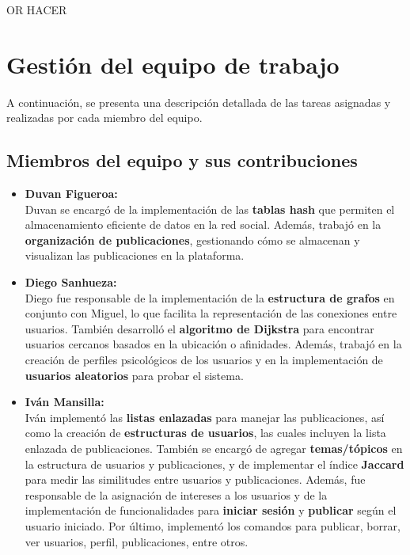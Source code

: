 \documentclass[9pt,letterpaper,onecolumn]{rho-class/rho}
\begin{document}
    OR HACER

\section{Gestión del equipo de trabajo}

    A continuación, se presenta una descripción detallada de las tareas asignadas y realizadas por cada miembro del equipo.
    
    \subsection{Miembros del equipo y sus contribuciones}
    
    \begin{itemize}
        \item \textbf{Duvan Figueroa:} \\
        Duvan se encargó de la implementación de las \textbf{tablas hash} que permiten el almacenamiento eficiente de datos en la red social. Además, trabajó en la \textbf{organización de publicaciones}, gestionando cómo se almacenan y visualizan las publicaciones en la plataforma.
    
        \item \textbf{Diego Sanhueza:} \\
        Diego fue responsable de la implementación de la \textbf{estructura de grafos} en conjunto con Miguel, lo que facilita la representación de las conexiones entre usuarios. También desarrolló el \textbf{algoritmo de Dijkstra} para encontrar usuarios cercanos basados en la ubicación o afinidades. Además, trabajó en la creación de perfiles psicológicos de los usuarios y en la implementación de \textbf{usuarios aleatorios} para probar el sistema.
    
        \item \textbf{Iván Mansilla:} \\
        Iván implementó las \textbf{listas enlazadas} para manejar las publicaciones, así como la creación de \textbf{estructuras de usuarios}, las cuales incluyen la lista enlazada de publicaciones. También se encargó de agregar \textbf{temas/tópicos} en la estructura de usuarios y publicaciones, y de implementar el índice \textbf{Jaccard} para medir las similitudes entre usuarios y publicaciones. Además, fue responsable de la asignación de intereses a los usuarios y de la implementación de funcionalidades para \textbf{iniciar sesión} y \textbf{publicar} según el usuario iniciado. Por último, implementó los comandos para publicar, borrar, ver usuarios, perfil, publicaciones, entre otros.
    

\end{itemize}
\end{document}
